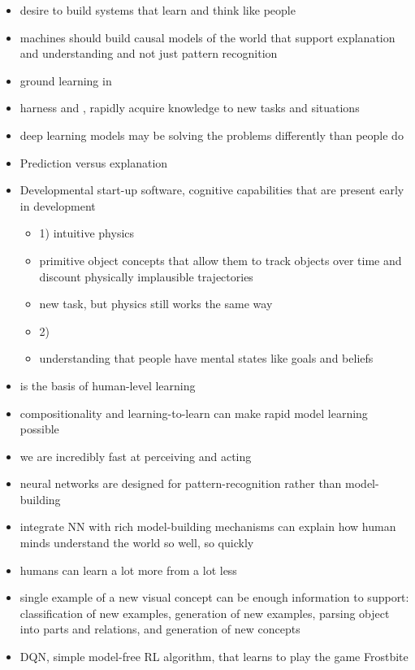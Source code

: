 \begin{itemize}
  \item desire to build systems that learn and think like people
  \item machines should build causal models of the world that support explanation and understanding and not just pattern recognition
  \item ground learning in 
  \item harness  and , rapidly acquire knowledge to new tasks and situations
  \item deep learning models may be solving the problems differently than people do
  \item Prediction versus explanation
  \item Developmental start-up software, cognitive capabilities that are present early in development
    \begin{itemize}
      \item 1) intuitive physics
      \item primitive object concepts that allow them to track objects over time and discount physically implausible trajectories
      \item new task, but physics still works the same way
      \item 2) 
      \item understanding that people have mental states like goals and beliefs
    \end{itemize}
  \item {} is the basis of human-level learning
  \item compositionality and learning-to-learn can make rapid model learning possible
  \item we are incredibly fast at perceiving and acting
  \item neural networks are designed for pattern-recognition rather than model-building
  \item integrate NN with rich model-building mechanisms can explain how human minds understand the world so well, so quickly
  \item humans can learn a lot more from a lot less
  \item single example of a new visual concept can be enough information to support: classification of new examples, generation of new examples, parsing object into parts and relations, and generation of new concepts
  \item DQN, simple model-free RL algorithm, that learns to play the game Frostbite

\end{itemize}
